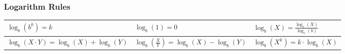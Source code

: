 \documentclass[twoside]{article}
\renewcommand{\arraystretch}{1.5} %
\begin{document}
\subsubsection*{Logarithm Rules}
\vspace{1em}
\sffamily
\bgroup
\def\arraystretch{2}
{\normalsize
\begin{center}
  \begin{tabular}{| >{\centering}m{5cm}| >{\centering}m{5cm}| >{\centering}m{5cm}|}
    \hline
    $\log_b(b^k) = k$
     &
    $\log_b(1) = 0$
     &
    $\log_b(X) = \frac{\log_c(X)}{\log_c(b)}$
    \tabularnewline \hline
    $\log_b(X \cdotp Y) = \log_b(X) + \log_b(Y)$
     &
    $\log_b(\frac{X}{Y}) = \log_b(X) - \log_b(Y)$
     &
    $\log_b(X^k) = k \cdotp \log_b(X)$
    \tabularnewline \hline
  \end{tabular}
\end{center}
}
\egroup
\vspace{1em}
\end{document}
